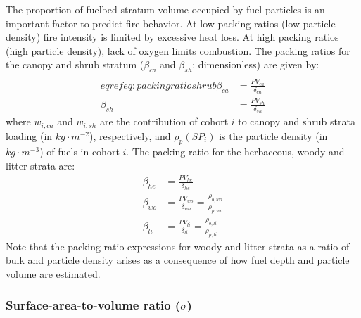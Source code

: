 \documentclass[]{book}
\begin{document}
The proportion of fuelbed stratum volume occupied by fuel particles is an important factor to predict fire behavior. At low packing ratios (low particle density) fire intensity is limited by excessive heat loss. At high packing ratios (high particle density), lack of oxygen limits combustion. The packing ratios for the canopy and shrub stratum (\(\beta_{ca}\) and \(\beta_{sh}\); dimensionless) are given by:
\begin{eqnarray}\\eqref{eq:packingratioshrub}
\beta _{ca} &= \frac{PV_{ca}}{\delta_{ca}}\\
\beta _{sh} &= \frac{PV_{sh}}{\delta_{sh}}
\end{eqnarray}
where \(w_{i,ca}\) and \(w_{i,sh}\) are the contribution of cohort \(i\) to canopy and shrub strata loading (in \(kg\cdot m^{-2}\)), respectively, and \(\rho_p(SP_i)\) is the particle density (in \(kg\cdot m^{-3}\)) of fuels in cohort \(i\). The packing ratio for the herbaceous, woody and litter strata are:
\begin{eqnarray}
\beta _{he} &= \frac{PV_{he}}{\delta_{he}}\\
\beta _{wo} &= \frac{PV_{wo}}{\delta_{wo}}= \frac{\rho_{b,wo}}{\rho_{p,wo}}\\
\beta _{li} &= \frac{PV_{li}}{\delta_{li}}= \frac{\rho_{b,li}}{\rho_{p,li}}
\end{eqnarray}
Note that the packing ratio expressions for woody and litter strata as a ratio of bulk and particle density arises as a consequence of how fuel depth and particle volume are estimated.

\hypertarget{surface-area-to-volume-ratio-sigma}{%
\subsubsection{\texorpdfstring{Surface-area-to-volume ratio (\(\sigma\))}{Surface-area-to-volume ratio (\textbackslash{}sigma)}}\label{surface-area-to-volume-ratio-sigma}}
\end{document}
